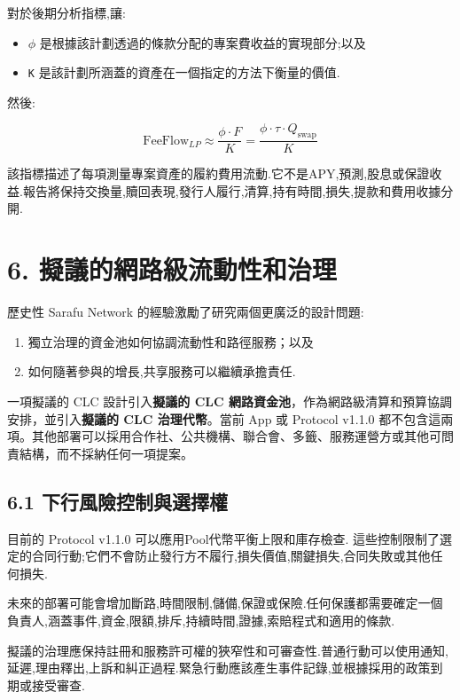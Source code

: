 \documentclass[11pt]{article}
\begin{document}
對於後期分析指標,讓:

\begin{itemize}[leftmargin=*]
\item \texttt{$\phi$} 是根據該計劃透過的條款分配的專案費收益的實現部分;以及
\item \texttt{K} 是該計劃所涵蓋的資產在一個指定的方法下衡量的價值.
\end{itemize}
然後:

\[
\mathrm{FeeFlow}_{LP} \approx \frac{\phi \cdot F}{K} = \frac{\phi \cdot \tau \cdot Q_{\mathrm{swap}}}{K}
\]

該指標描述了每項測量專案資產的履約費用流動.它不是APY,預測,股息或保證收益.報告將保持交換量,贖回表現,發行人履行,清算,持有時間,損失,提款和費用收據分開.


\section*{6. 擬議的網路級流動性和治理}

歷史性 Sarafu Network 的經驗激勵了研究兩個更廣泛的設計問題:

\begin{enumerate}[leftmargin=*]
\item 獨立治理的資金池如何協調流動性和路徑服務；以及
\item 如何隨著參與的增長,共享服務可以繼續承擔責任.
\end{enumerate}
一項擬議的 CLC 設計引入\textbf{擬議的 CLC 網路資金池}，作為網路級清算和預算協調安排，並引入\textbf{擬議的 CLC 治理代幣}。當前 App 或 Protocol v1.1.0 都不包含這兩項。其他部署可以採用合作社、公共機構、聯合會、多籤、服務運營方或其他可問責結構，而不採納任何一項提案。

\subsection*{6.1 下行風險控制與選擇權}

目前的 Protocol v1.1.0 可以應用Pool代幣平衡上限和庫存檢查. 這些控制限制了選定的合同行動;它們不會防止發行方不履行,損失價值,關鍵損失,合同失敗或其他任何損失.

未來的部署可能會增加斷路,時間限制,儲備,保證或保險.任何保護都需要確定一個負責人,涵蓋事件,資金,限額,排斥,持續時間,證據,索賠程式和適用的條款.

擬議的治理應保持註冊和服務許可權的狹窄性和可審查性.普通行動可以使用通知,延遲,理由釋出,上訴和糾正過程.緊急行動應該產生事件記錄,並根據採用的政策到期或接受審查.
\end{document}
